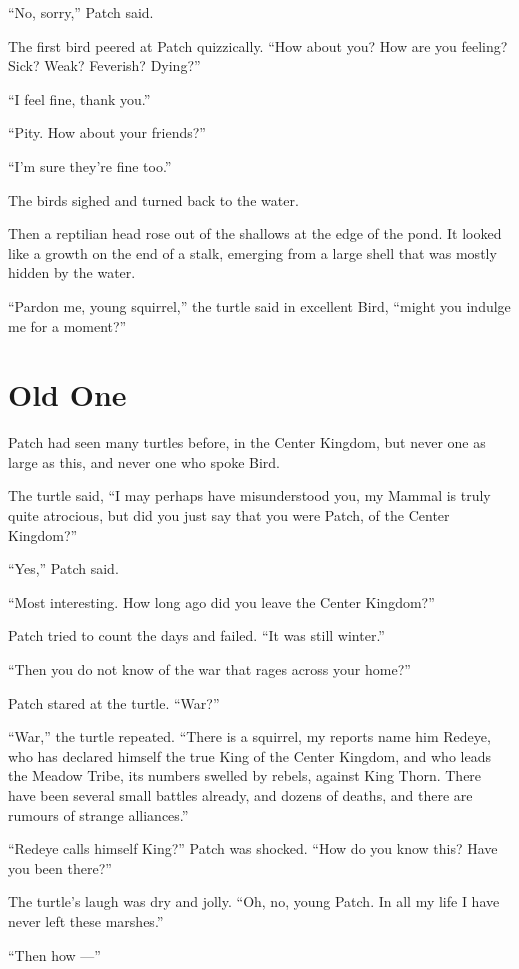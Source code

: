 \documentclass[12pt]{memoir}
\begin{document}
“No, sorry,” Patch said.

The first bird peered at Patch quizzically. “How about you? How are
you feeling? Sick? Weak? Feverish? Dying?”

“I feel fine, thank you.”

“Pity. How about your friends?”

“I’m sure they’re fine too.”

The birds sighed and turned back to the water.

Then a reptilian head rose out of the shallows at the edge of the
pond. It looked like a growth on the end of a stalk, emerging from a
large shell that was mostly hidden by the water.

“Pardon me, young squirrel,” the turtle said in excellent Bird, “might
you indulge me for a moment?”


\section{Old One}

Patch had seen many turtles before, in the Center Kingdom, but never
one as large as this, and never one who spoke Bird.

The turtle said, “I may perhaps have misunderstood you, my Mammal is
truly quite atrocious, but did you just say that you were Patch, of
the Center Kingdom?”

“Yes,” Patch said.

“Most interesting. How long ago did you leave the Center Kingdom?”

Patch tried to count the days and failed. “It was still winter.”

“Then you do not know of the war that rages across your home?”

Patch stared at the turtle. “War?”

“War,” the turtle repeated. “There is a squirrel, my reports name him
Redeye, who has declared himself the true King of the Center Kingdom,
and who leads the Meadow Tribe, its numbers swelled by rebels, against
King Thorn. There have been several small battles already, and dozens
of deaths, and there are rumours of strange alliances.”

“Redeye calls himself King?” Patch was shocked. “How do you know this?
Have you been there?”

The turtle’s laugh was dry and jolly. “Oh, no, young Patch. In all my
life I have never left these marshes.”

“Then how —”
\end{document}
